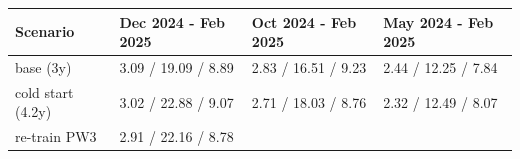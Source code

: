 \documentclass[
  10pt, ]{article}
\begin{document}
\begin{longtable}[]{@{}llll@{}}
\toprule
\begin{minipage}[b]{0.22\columnwidth}\raggedright
Scenario\strut
\end{minipage} & \begin{minipage}[b]{0.22\columnwidth}\raggedright
Dec 2024 - Feb 2025\strut
\end{minipage} & \begin{minipage}[b]{0.22\columnwidth}\raggedright
Oct 2024 - Feb 2025\strut
\end{minipage} & \begin{minipage}[b]{0.22\columnwidth}\raggedright
May 2024 - Feb 2025\strut
\end{minipage}\tabularnewline
\midrule
\endhead
\begin{minipage}[t]{0.22\columnwidth}\raggedright
base (3y)\strut
\end{minipage} & \begin{minipage}[t]{0.22\columnwidth}\raggedright
3.09 / 19.09 / 8.89\strut
\end{minipage} & \begin{minipage}[t]{0.22\columnwidth}\raggedright
2.83 / 16.51 / 9.23\strut
\end{minipage} & \begin{minipage}[t]{0.22\columnwidth}\raggedright
2.44 / 12.25 / 7.84\strut
\end{minipage}\tabularnewline
\begin{minipage}[t]{0.22\columnwidth}\raggedright
cold start (4.2y)\strut
\end{minipage} & \begin{minipage}[t]{0.22\columnwidth}\raggedright
3.02 / 22.88 / 9.07\strut
\end{minipage} & \begin{minipage}[t]{0.22\columnwidth}\raggedright
2.71 / 18.03 / 8.76\strut
\end{minipage} & \begin{minipage}[t]{0.22\columnwidth}\raggedright
2.32 / 12.49 / 8.07\strut
\end{minipage}\tabularnewline
\begin{minipage}[t]{0.22\columnwidth}\raggedright
re-train PW3\strut
\end{minipage} & \begin{minipage}[t]{0.22\columnwidth}\raggedright
2.91 / 22.16 / 8.78\strut
\end{minipage} & \begin{minipage}[t]{0.22\columnwidth}\raggedright

\end{minipage}
\end{longtable}
\end{document}
